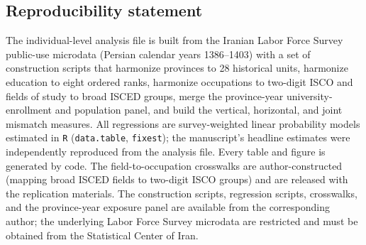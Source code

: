 \subsection*{Reproducibility statement}

The individual-level analysis file is built from the Iranian Labor Force Survey public-use
microdata (Persian calendar years 1386--1403) with a set of construction scripts that harmonize
provinces to 28 historical units, harmonize education to eight ordered ranks, harmonize occupations
to two-digit ISCO and fields of study to broad ISCED groups, merge the province-year
university-enrollment and population panel, and build the vertical, horizontal, and joint mismatch
measures. All regressions are survey-weighted linear probability models estimated in \texttt{R}
(\texttt{data.table}, \texttt{fixest}); the manuscript's headline estimates were independently
reproduced from the analysis file. Every table and figure is generated by code. The field-to-occupation
crosswalks are author-constructed (mapping broad ISCED fields to two-digit ISCO groups) and are
released with the replication materials. The construction scripts, regression scripts, crosswalks,
and the province-year exposure panel are available from the corresponding author; the underlying
Labor Force Survey microdata are restricted and must be obtained from the Statistical Center of Iran.

\clearpage
